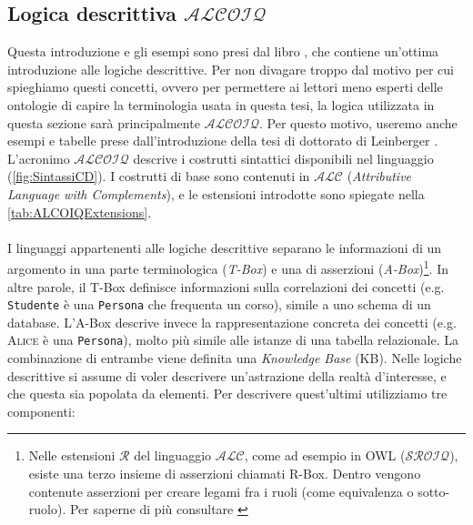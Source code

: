 \subsection[Logica  descrittiva $\mathcal{ALCOIQ}$]{Logica  descrittiva $\mathcal{ALCOIQ}$}
\label{sec:logicaALCOIQ}
Questa introduzione e gli esempi sono presi dal libro \cite{baader2017introductionDL}, che contiene un'ottima introduzione alle logiche descrittive. Per non divagare troppo dal motivo per cui spieghiamo questi concetti, ovvero per permettere ai lettori meno esperti delle ontologie di capire la terminologia usata in questa tesi, la logica utilizzata in questa sezione sarà principalmente $\mathcal{ALCOIQ}$. Per questo motivo, useremo anche esempi e tabelle prese dall'introduzione della tesi di dottorato di Leinberger \cite{leinbergerphdthesis}. L'acronimo $\mathcal{ALCOIQ}$ descrive i costrutti sintattici disponibili nel linguaggio (\autoref{fig:SintassiCD}). I costrutti di base sono contenuti in $\mathcal{ALC}$ (\textit{Attributive Language with Complements}), e le estensioni introdotte sono spiegate nella \autoref{tab:ALCOIQExtensions}. \\\\
I linguaggi appartenenti alle logiche descrittive separano le informazioni di un argomento in una parte terminologica (\textit{T-Box}) e una di asserzioni (\textit{A-Box})\footnote{ Nelle estensioni $\mathcal{R}$ del linguaggio $\mathcal{ALC}$, come ad esempio in OWL ($\mathcal{SROIQ}$), esiste una terzo insieme di asserzioni chiamati R-Box. Dentro vengono contenute asserzioni per creare legami fra i ruoli (come equivalenza o sotto-ruolo). Per saperne di più consultare \cite{baader2017introductionDL}}. In altre parole, il T-Box definisce informazioni sulla correlazioni dei concetti (e.g. \texttt{Studente} è una \texttt{Persona} che frequenta un corso), simile a uno schema di un database. L’A-Box descrive invece la rappresentazione concreta dei concetti (e.g. \textsc{Alice} è una \texttt{Persona}), molto più simile alle istanze di una tabella relazionale. La combinazione di entrambe viene definita una \textit{Knowledge Base} (KB).
Nelle logiche descrittive si assume di voler descrivere un’astrazione della realtà d’interesse, e che questa sia popolata da elementi. Per descrivere quest'ultimi utilizziamo tre componenti:
